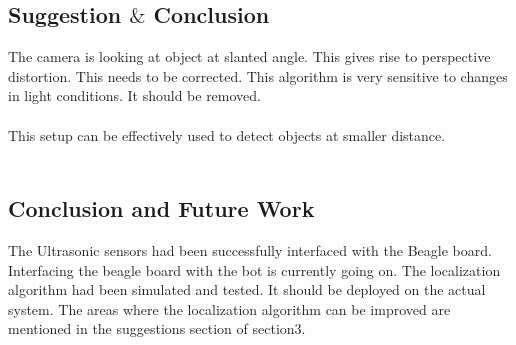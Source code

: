 \documentclass[12pt]{article}
\begin{document}
\subsection{Suggestion $\&$ Conclusion}
The camera is looking at object at slanted angle. This gives rise to perspective distortion. This needs to be corrected. This algorithm is very sensitive to changes in light conditions. It should be removed.\\
\\
This setup can be effectively used to detect objects at smaller distance.\\
\\
\subsection{Conclusion and Future Work}
The Ultrasonic sensors had been successfully interfaced with the Beagle board. Interfacing the beagle board with the bot is currently going on. The localization algorithm had been simulated and tested. It should be deployed on the actual system. The areas where the localization algorithm can be improved are mentioned in the suggestions section of section3.




\newpage
\end{document}
